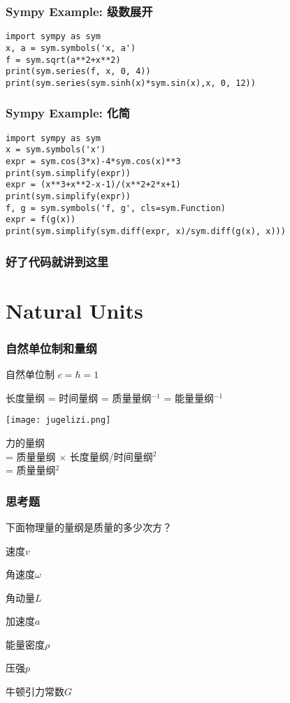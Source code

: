 \documentclass[CJK,13pt]{beamer}
\begin{document}
\begin{frame}[fragile]
  \frametitle{Sympy Example: 级数展开}
\begin{verbatim} 
import sympy as sym
x, a = sym.symbols('x, a')
f = sym.sqrt(a**2+x**2)
print(sym.series(f, x, 0, 4))
print(sym.series(sym.sinh(x)*sym.sin(x),x, 0, 12))
\end{verbatim}
\ecode
\end{frame}

\begin{frame}[fragile]
  \frametitle{Sympy Example: 化简}
\begin{verbatim}
import sympy as sym
x = sym.symbols('x')
expr = sym.cos(3*x)-4*sym.cos(x)**3
print(sym.simplify(expr))
expr = (x**3+x**2-x-1)/(x**2+2*x+1)
print(sym.simplify(expr))
f, g = sym.symbols('f, g', cls=sym.Function)
expr = f(g(x))
print(sym.simplify(sym.diff(expr, x)/sym.diff(g(x), x))) 
\end{verbatim}
\ecode
\end{frame}

\begin{frame}
  \frametitle{好了代码就讲到这里}
\end{frame}

\section{Natural Units}


\begin{frame}
\frametitle{ 自然单位制和量纲 }
 自然单位制  $c = \hbar  = 1$


长度量纲 = 时间量纲 = 质量量纲$^{-1}$ = 能量量纲$^{-1}$ 


{\vskip 0.2in}
\begin{minipage}{0.3\textwidth}
\texttt{[image: jugelizi.png]}
\end{minipage}
\begin{minipage}{0.6\textwidth}

力的量纲 \\
= 质量量纲 $\times$ 长度量纲/时间量纲$^2$ \\
= 质量量纲$^2$

\end{minipage}

\end{frame}

\begin{frame}
\frametitle{ 思考题}


下面物理量的量纲是质量的多少次方？

速度$v$

角速度$\omega$

角动量$L$

加速度$a$

能量密度$\rho$

压强$p$

牛顿引力常数$G$

\end{frame}
\end{document}
